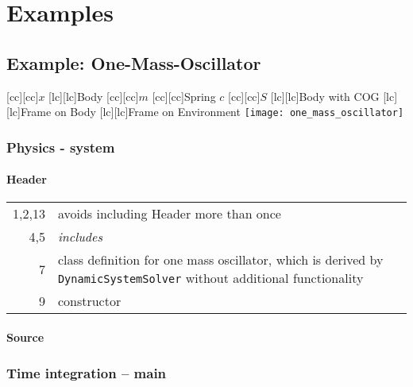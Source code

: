 \section{Examples}

\subsection{Example: One-Mass-Oscillator}

\hspace*{0.2\hsize}
   [cc][cc]{$x$}
   [lc][lc]{Body}
   [cc][cc]{$m$}
   [cc][cc]{Spring $c$}
   [cc][cc]{$S$}
   [lc][lc]{Body with COG}
  [lc][lc]{Frame on Body}
  [lc][lc]{Frame on Environment}
  \texttt{[image: one\_mass\_oscillator]}

\subsubsection{Physics - system}

\paragraph{Header}


\begin{tabular}{r|p{0.85\hsize}}
  1,2,13 & avoids including Header more than once\\
  4,5  & \emph{includes}\\
  7 & class definition for one mass oscillator, which is derived by \texttt{DynamicSystemSolver} without additional functionality\\
  9 & constructor
\end{tabular}

\paragraph{Source}


\subsubsection{Time integration -- main}


